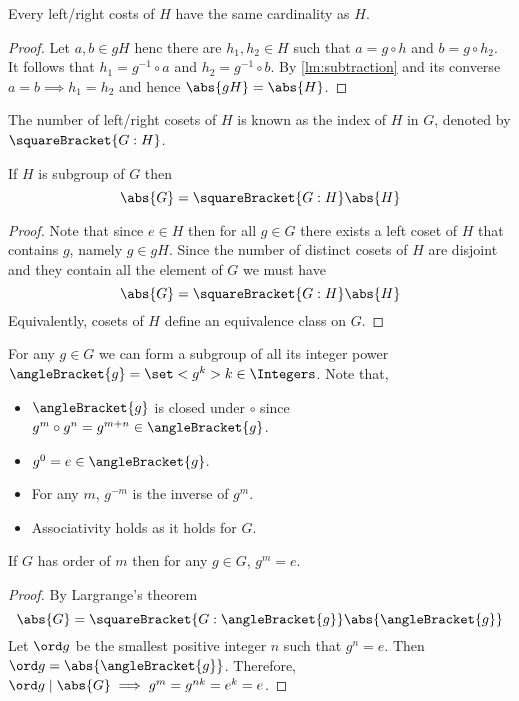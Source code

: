 \begin{proposition}
    Every left/right costs of \(H\) have the same cardinality as \(H\).
\end{proposition}
\begin{proof}
    Let \(a,b \in gH\) henc there are \(h_1,h_2 \in H\) such that \(a = g\circ h\) and \(b = g \circ h_2\). It follows that \(h_1 = g^{-1} \circ a\) and \(h_2 = g^{-1} \circ b\). By \ref{lm:subtraction} and its converse \(a = b \implies h_1 = h_2\) and hence \(\abs{gH} = \abs{H}\).
\end{proof}
The number of left/right cosets of \(H\) is known as the index of \(H\) in \(G\), denoted by \(\squareBracket{G:H}\).
\begin{theorem}
    If \(H\) is subgroup of \(G\) then 
    \begin{equation*}
        \abs{G} = \squareBracket{G:H} \abs{H}
    \end{equation*}
\end{theorem}
\begin{proof}
    Note that since \(e \in H\) then for all \(g \in G\) there exists a left coset of \(H\) that contains \(g\), namely \(g \in gH\). Since the number of distinct cosets of \(H\) are disjoint and they contain all the element of \(G\) we must have 
    \begin{equation*}
        \abs{G} = \squareBracket{G:H} \abs{H}
    \end{equation*}
    Equivalently, cosets of \(H\) define an equivalence class on \(G\).
\end{proof}

For any \(g \in G\) we can form a subgroup of all its integer power \(\angleBracket{g} = \set<g^k>{k \in \Integers}\). Note that, 
\begin{itemize}
    \item \(\angleBracket{g}\) is closed under \(\circ\) since \(g^m \circ g^n= g^{m + n} \in \angleBracket{g}\).
    \item \(g^0 = e \in \angleBracket{g}\).
    \item For any \(m\), \(g^{-m}\) is the inverse of \(g^m\).
    \item Associativity holds as it holds for \(G\).
\end{itemize}
\begin{proposition}
    If \(G\) has order of \(m\) then for any \(g \in G\), \(g^m = e\).
\end{proposition}
\begin{proof}
    By Largrange's theorem 
    \begin{equation*}
        \abs{G} =  \squareBracket{G:\angleBracket{g}} \abs{\angleBracket{g}}
    \end{equation*}
    Let \(\ord g\) be the smallest positive integer \(n\) such that \(g^n = e\). Then \(\ord g = \abs{\angleBracket{g}}\). Therefore, \(\ord g \mid \abs{G} \implies g^m = g^{nk} = e^k = e\).
\end{proof}

